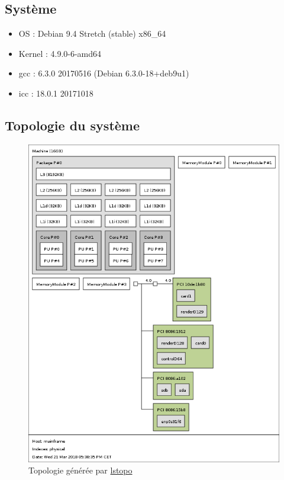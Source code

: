 \documentclass{report}
\begin{document}
    \subsection{Système}
      \begin{itemize}
      \item OS : Debian 9.4 Stretch (stable) x86\_64
      \item Kernel :  4.9.0-6-amd64
      \item gcc : 6.3.0 20170516 (Debian 6.3.0-18+deb9u1)
      \item icc : 18.0.1 20171018
    \end{itemize}
  \subsection{Topologie du système}
    \begin{figure}[ht!]
      \centering
      \includegraphics[scale=0.35]{resources/lstopo.png}
      \caption{Topologie générée par \href{https://manpages.debian.org/jessie/hwloc/lstopo.1.en.html}{lstopo}}
    \end{figure}
  \newpage
\end{document}
